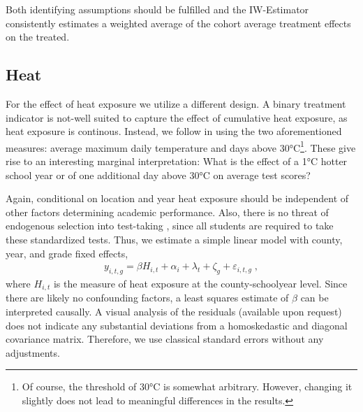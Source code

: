 Both identifying assumptions should be fulfilled and the IW-Estimator consistently estimates a weighted average of the cohort average treatment effects on the treated.


\subsection{Heat}

For the effect of heat exposure we utilize a different design. A binary treatment indicator is not-well suited to capture the effect of cumulative heat exposure, as heat exposure is continous. Instead, we follow \cite{Goodman_2020} in using the two aforementioned measures: average maximum daily temperature and days above 30°C\footnote{Of course, the threshold of 30°C is somewhat arbitrary. However, changing it slightly does not lead to meaningful differences in the results.}. These give rise to an interesting marginal interpretation: What is the effect of a 1°C hotter school year or of one additional day above 30°C on average test scores?

Again, conditional on location and year heat exposure should be independent of other factors determining academic performance. Also, there is no threat of endogenous selection into test-taking \citep[as in][]{Goodman_2020}, since all students are required to take these standardized tests. Thus, we estimate a simple linear model with county, year, and grade fixed effects,
\begin{align}
	y_{i, t, g} = \beta H_{i, t} + \alpha_i + \lambda_t + \zeta_g + \varepsilon_{i, t, g} \;,
\end{align}
where $H_{i, t}$ is the measure of heat exposure at the county-schoolyear level. Since there are likely no confounding factors, a least squares estimate of $\beta$ can be interpreted causally. A visual analysis of the residuals (available upon request) does not indicate any substantial deviations from a homoskedastic and diagonal covariance matrix. Therefore, we use classical standard errors without any adjustments.








